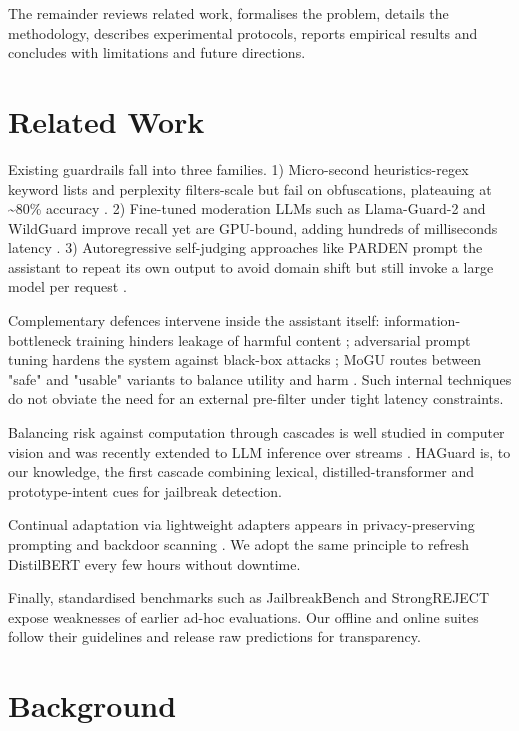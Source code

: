 \documentclass{article}
\begin{document}
The remainder reviews related work, formalises the problem, details the methodology, describes experimental protocols, reports empirical results and concludes with limitations and future directions.

\section{Related Work}
Existing guardrails fall into three families. 1) Micro-second heuristics-regex keyword lists and perplexity filters-scale but fail on obfuscations, plateauing at \textasciitilde 80\% accuracy \cite{alon-2023-detecting}. 2) Fine-tuned moderation LLMs such as Llama-Guard-2 and WildGuard improve recall yet are GPU-bound, adding hundreds of milliseconds latency \cite{han-2024-wildguard,inan-2023-llama}. 3) Autoregressive self-judging approaches like PARDEN prompt the assistant to repeat its own output to avoid domain shift but still invoke a large model per request \cite{zhang-2024-parden}.

Complementary defences intervene inside the assistant itself: information-bottleneck training hinders leakage of harmful content \cite{liu-2024-protecting}; adversarial prompt tuning hardens the system against black-box attacks \cite{mo-2024-fight}; MoGU routes between "safe" and "usable" variants to balance utility and harm \cite{du-2024-mogu}. Such internal techniques do not obviate the need for an external pre-filter under tight latency constraints.

Balancing risk against computation through cascades is well studied in computer vision \cite{goren-2024-hierarchical} and was recently extended to LLM inference over streams \cite{nie-2024-online}. HAGuard is, to our knowledge, the first cascade combining lexical, distilled-transformer and prototype-intent cues for jailbreak detection.

Continual adaptation via lightweight adapters appears in privacy-preserving prompting \cite{duan-2023-flocks} and backdoor scanning \cite{shen-2021-backdoor}. We adopt the same principle to refresh DistilBERT every few hours without downtime.

Finally, standardised benchmarks such as JailbreakBench \cite{chao-2024-jailbreakbench} and StrongREJECT \cite{souly-2024-strongreject} expose weaknesses of earlier ad-hoc evaluations. Our offline and online suites follow their guidelines and release raw predictions for transparency.

\section{Background}
\end{document}
